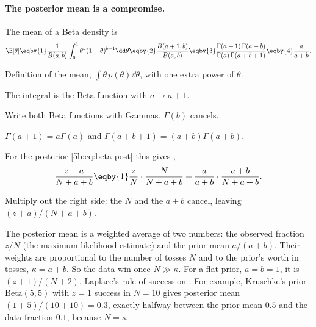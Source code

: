 \paragraph{The posterior mean is a compromise.}
The mean of a Beta density is
\begin{align*}
  \E[\theta]
  \eqby{1}\frac{1}{B(a,b)}\int_0^1\theta^{a}(1-\theta)^{b-1}\dd\theta
  \eqby{2}\frac{B(a+1,b)}{B(a,b)}
  \eqby{3}\frac{\Gamma(a+1)\,\Gamma(a+b)}{\Gamma(a)\,\Gamma(a+b+1)}
  \eqby{4}\frac{a}{a+b}.
\end{align*}
\begin{explain}
  \item Definition of the mean, $\int\theta\,p(\theta)\dd\theta$, with one extra power
        of $\theta$.
  \item The integral is the Beta function with $a\to a+1$.
  \item Write both Beta functions with Gammas. $\Gamma(b)$ cancels.
  \item $\Gamma(a+1)=a\Gamma(a)$ and $\Gamma(a+b+1)=(a+b)\Gamma(a+b)$.
\end{explain}
For the posterior \eqref{5b:eq:beta-post} this gives ,
\begin{align}
  \frac{z+a}{N+a+b}
  \eqby{1}\frac{z}{N}\cdot\frac{N}{N+a+b}+\frac{a}{a+b}\cdot\frac{a+b}{N+a+b} .
  \label{5b:eq:beta-mean}
\end{align}
\begin{explain}
  \item Multiply out the right side: the $N$ and the $a+b$ cancel, leaving
        $(z+a)/(N+a+b)$.
\end{explain}
The posterior mean is a weighted average of two numbers: the observed fraction $z/N$
(the maximum likelihood estimate) and the prior mean $a/(a+b)$. Their weights are
proportional to the number of tosses $N$ and to the prior's worth in tosses,
$\kappa=a+b$. So the data win once $N\gg\kappa$. For a flat prior, $a=b=1$, it is
$(z+1)/(N+2)$, Laplace's rule of succession . For
example, Kruschke's prior $\mathrm{Beta}(5,5)$ with $z=1$ success in $N=10$ gives
posterior mean $(1+5)/(10+10)=0.3$, exactly halfway between the prior mean $0.5$ and the
data fraction $0.1$, because $N=\kappa$ .

